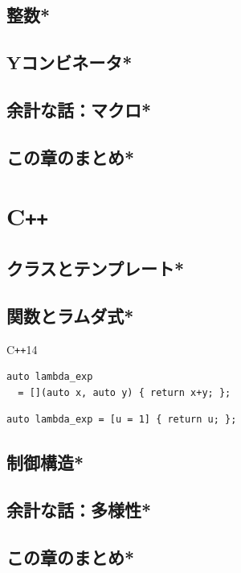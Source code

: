 \documentclass[a4paper,twocolumn]{jsbook}
\newcommand{\programminglanguage}[1]{\textsf{#1}}
\newcommand{\cxx}{\programminglanguage{C}\texttt{++}}
\newcommand{\cxxfourteen}{\cxx\programminglanguage{14}}
\begin{document}
\section{整数*}
\section{Yコンビネータ*}


\section{余計な話：マクロ*}

\section{この章のまとめ*}

\chapter{\cxx}

\section{クラスとテンプレート*}
\section{関数とラムダ式*}

\cxxfourteen
\begin{verbatim}
auto lambda_exp
  = [](auto x, auto y) { return x+y; };
\end{verbatim}

\begin{verbatim}
auto lambda_exp = [u = 1] { return u; };
\end{verbatim}



\section{制御構造*}
\section{余計な話：多様性*}
\section{この章のまとめ*}
\end{document}
